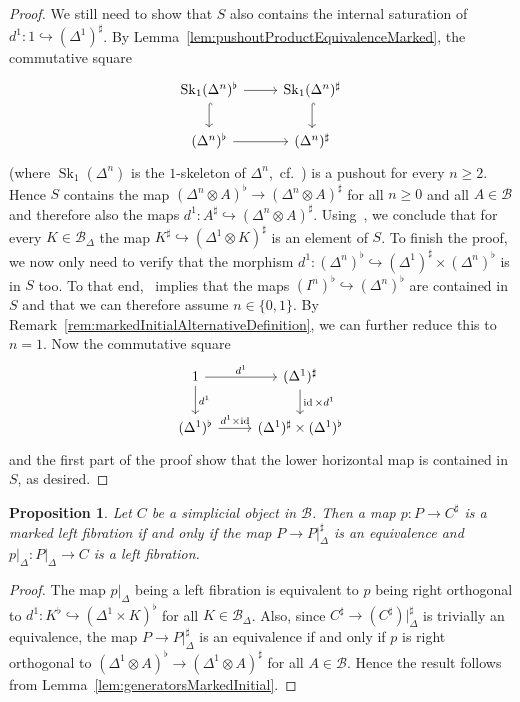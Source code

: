 \documentclass[reqno]{amsart}
\numberwithin{equation}{subsection}
\theoremstyle{plain}
\newtheorem{proposition}[equation]{Proposition}
\theoremstyle{definition}
\let\scr=\mathcal
\let\into=\hookrightarrow
\def\BB{\scr B}
\DeclareMathOperator{\id}{id}
\DeclareMathOperator{\Sk}{Sk}
\newcommand{\Simp}[1]{#1_{\Delta}}
\begin{document}
\begin{proof}
	We still need to show that $S$ also contains the internal saturation of $d^1\colon 1\into(\Delta^1)^\sharp$. By Lemma~\ref{lem:pushoutProductEquivalenceMarked}, the commutative square
	\begin{equation*}
	\begin{tikzcd}
	\Sk_1(\Delta^n)^\flat\arrow[r]\arrow[d, hookrightarrow] & \Sk_1(\Delta^n)^\sharp\arrow[d, hookrightarrow]\\
	(\Delta^n)^\flat\arrow[r] & (\Delta^n)^\sharp
	\end{tikzcd}
	\end{equation*}
	(where $\Sk_1(\Delta^n)$ is the $1$-skeleton of $\Delta^n$,~cf.~\cite[\S~2.9]{Martini2021a}) is a pushout for every $n\geq 2$. Hence $S$ contains the map $(\Delta^n\otimes A)^\flat\to(\Delta^n\otimes A)^\sharp$ for all $n\geq 0$ and all $A\in\BB$ and therefore also the maps $d^1\colon A^\sharp\into(\Delta^n\otimes A)^\sharp$. Using~\cite[Lemma~4.1.2]{Martini2021}, we conclude that for every $K\in\Simp\BB$ the map $K^\sharp\into(\Delta^1\otimes K)^\sharp$ is an element of $S$. To finish the proof, we now only need to verify that the morphism $d^1\colon (\Delta^n)^\flat\into(\Delta^1)^\sharp\times(\Delta^n)^\flat$ is in $S$ too. To that end,~\cite[Lemma~4.1.4]{Martini2021} implies that the maps $(I^n)^\flat\into (\Delta^n)^\flat$ are contained in $S$ and that we can therefore assume $n\in\{0,1\}$. By Remark~\ref{rem:markedInitialAlternativeDefinition}, we can further reduce this to $n=1$. 
	Now the commutative square
	\begin{equation*}
	\begin{tikzcd}
	1\arrow[d, "d^1"]\arrow[r, "d^1"] & (\Delta^1)^\sharp\arrow[d, "\id\times d^1"]\\
	(\Delta^1)^\flat\arrow[r, "d^1\times \id"] & (\Delta^1)^\sharp\times(\Delta^1)^\flat
	\end{tikzcd}
	\end{equation*}
	and the first part of the proof show that the lower horizontal map is contained in $S$, as desired.
\end{proof}
\begin{proposition}
	\label{prop:markedLeftFibrationSharp}
	Let $C$ be a simplicial object in $\BB$. Then a map $p\colon P\to C^\sharp$ is a marked left fibration if and only if the map $P\to P\vert_{\Delta}^\sharp$ is an equivalence and $p\vert_{\Delta}\colon P\vert_{\Delta}\to C$ is a left fibration.
\end{proposition}
\begin{proof}
	The map $p\vert_{\Delta}$ being a left fibration is equivalent to $p$ being right orthogonal to $d^1\colon K^\flat\into (\Delta^1\times K)^\flat$ for all $K\in\Simp\BB$. Also, since $C^\sharp\to (C^\sharp)\vert_{\Delta}^\sharp$ is trivially an equivalence, the map $P\to P\vert_{\Delta}^\sharp$ is an equivalence if and only if $p$ is right orthogonal to $(\Delta^1\otimes A)^\flat\to (\Delta^1\otimes A)^\sharp$ for all $A\in\BB$. Hence the result follows from Lemma~\ref{lem:generatorsMarkedInitial}.
\end{proof}
\end{document}
